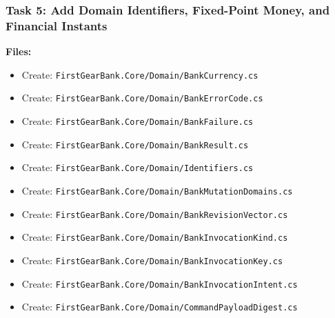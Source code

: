 \documentclass[
  10pt,
  letterpaper,
]{article}
\providecommand{\tightlist}{%
  \setlength{\itemsep}{0pt}\setlength{\parskip}{0pt}}
\begin{document}
\subsubsection{Task 5: Add Domain Identifiers, Fixed-Point Money, and
Financial
Instants}\label{task-5-add-domain-identifiers-fixed-point-money-and-financial-instants}

\textbf{Files:}

\begin{itemize}
\tightlist
\item
  Create:
  \texttt{FirstGearBank.}\allowbreak{}\texttt{Core/}\allowbreak{}\texttt{Domain/}\allowbreak{}\texttt{BankCurrency.}\allowbreak{}\texttt{cs}
\item
  Create:
  \texttt{FirstGearBank.}\allowbreak{}\texttt{Core/}\allowbreak{}\texttt{Domain/}\allowbreak{}\texttt{BankErrorCode.}\allowbreak{}\texttt{cs}
\item
  Create:
  \texttt{FirstGearBank.}\allowbreak{}\texttt{Core/}\allowbreak{}\texttt{Domain/}\allowbreak{}\texttt{BankFailure.}\allowbreak{}\texttt{cs}
\item
  Create:
  \texttt{FirstGearBank.}\allowbreak{}\texttt{Core/}\allowbreak{}\texttt{Domain/}\allowbreak{}\texttt{BankResult.}\allowbreak{}\texttt{cs}
\item
  Create:
  \texttt{FirstGearBank.}\allowbreak{}\texttt{Core/}\allowbreak{}\texttt{Domain/}\allowbreak{}\texttt{Identifiers.}\allowbreak{}\texttt{cs}
\item
  Create:
  \texttt{FirstGearBank.}\allowbreak{}\texttt{Core/}\allowbreak{}\texttt{Domain/}\allowbreak{}\texttt{BankMutationDomains.}\allowbreak{}\texttt{cs}
\item
  Create:
  \texttt{FirstGearBank.}\allowbreak{}\texttt{Core/}\allowbreak{}\texttt{Domain/}\allowbreak{}\texttt{BankRevisionVector.}\allowbreak{}\texttt{cs}
\item
  Create:
  \texttt{FirstGearBank.}\allowbreak{}\texttt{Core/}\allowbreak{}\texttt{Domain/}\allowbreak{}\texttt{BankInvocationKind.}\allowbreak{}\texttt{cs}
\item
  Create:
  \texttt{FirstGearBank.}\allowbreak{}\texttt{Core/}\allowbreak{}\texttt{Domain/}\allowbreak{}\texttt{BankInvocationKey.}\allowbreak{}\texttt{cs}
\item
  Create:
  \texttt{FirstGearBank.}\allowbreak{}\texttt{Core/}\allowbreak{}\texttt{Domain/}\allowbreak{}\texttt{BankInvocationIntent.}\allowbreak{}\texttt{cs}
\item
  Create:
  \texttt{FirstGearBank.}\allowbreak{}\texttt{Core/}\allowbreak{}\texttt{Domain/}\allowbreak{}\texttt{CommandPayloadDigest.}\allowbreak{}\texttt{cs}

\end{itemize}
\end{document}
